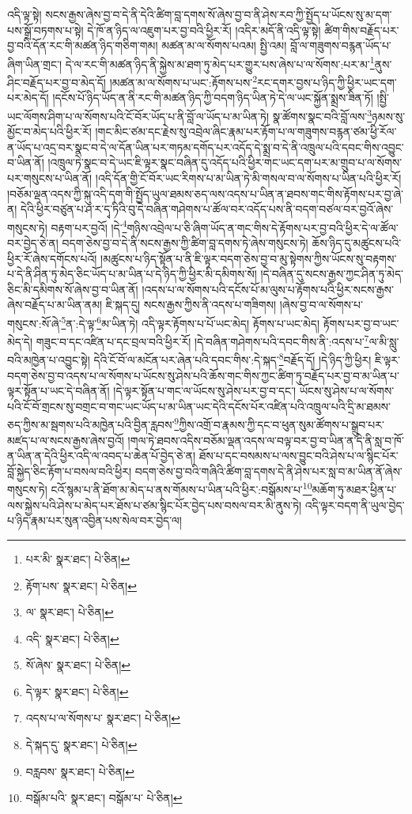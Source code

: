 འདི་ལྟ་སྟེ། སངས་རྒྱས་ཞེས་བྱ་བ་དེ་ནི་དེའི་ཚིག་བླ་དགས་སོ་ཞེས་བྱ་བ་ནི་ཤེས་རབ་ཀྱི་སྤྱོད་པ་ཡོངས་སུ་མ་དག་པས་སྒྲོ་བཏགས་པ་སྟེ། དེ་ཁོ་ན་ཉིད་ལ་འཇུག་པར་བྱ་བའི་ཕྱིར་རོ། །འདིར་མདོ་ནི་འདི་ལྟ་སྟེ། ཚིག་གིས་བརྗོད་པར་བྱ་བའི་དོན་རང་གི་མཚན་ཉིད་གཅིག་གམ། མཚན་མ་ལ་སོགས་པའམ། སྤྱི་འམ། བློ་ལ་གཟུགས་བརྙན་ཡོད་པ་ཞིག་ཡིན་གྲང་། དེ་ལ་རང་གི་མཚན་ཉིད་ནི་སྐྱེས་མ་ཐག་ཏུ་མེད་པར་གྱུར་པས་ཞེས་པ་ལ་སོགས་:པར་མ་\footnote{པར་མི་  སྣར་ཐང་།  པེ་ཅིན། }ནུས་ཤིང་བརྗོད་པར་བྱ་བ་མེད་དོ། །མཚན་མ་ལ་སོགས་པ་ཡང་:རྟོགས་པས་\footnote{རྟོག་པས་  སྣར་ཐང་།  པེ་ཅིན། }རང་དགར་བྱས་པ་ཉིད་ཀྱི་ཕྱིར་ཡང་དག་པར་མེད་དོ། །དངོས་པོ་ཉིད་ཡོད་ན་ནི་རང་གི་མཚན་ཉིད་ཀྱི་བདག་ཉིད་ཡིན་ཏེ་དེ་ལ་ཡང་སྐྱོན་སྨྲས་ཟིན་ཏོ། །སྤྱི་ཡང་ལོགས་ཤིག་པ་ལ་སོགས་པའི་ངོ་བོར་ཡོད་པ་ནི་བློ་ལ་ཡོད་པ་མ་ཡིན་ཏེ། སྣ་ཚོགས་སྣང་བའི་བློ་ལས་\footnote{ལ་  སྣར་ཐང་།  པེ་ཅིན། }ཉམས་སུ་མྱོང་བ་མེད་པའི་ཕྱིར་རོ། །གང་མིང་ཙམ་དང་རྗེས་སུ་འབྲེལ་ཞིང་རྣམ་པར་རྟོག་པ་ལ་གཟུགས་བརྙན་ཙམ་ཕྱི་རོལ་ན་ཡོད་པ་འདྲ་བར་སྣང་བ་དེ་ལ་དོན་ཡིན་པར་གཏམ་དགོད་པར་འདོད་དེ་སྨྲ་བ་དེ་ནི་འཁྲུལ་པའི་དབང་གིས་འབྱུང་བ་ཡིན་ནོ། །འཁྲུལ་ཏེ་སྣང་བ་དེ་ཡང་ཇི་ལྟར་སྣང་བཞིན་དུ་འདོད་པའི་ཕྱིར་གང་ཡང་དག་པར་མ་གྲུབ་པ་ལ་སོགས་པར་གསུངས་པ་ཡིན་ནོ། །འདི་དོན་གྱི་ངོ་བོར་ཡང་རིགས་པ་མ་ཡིན་ཏེ་མི་གསལ་བ་ལ་སོགས་པ་ཡིན་པའི་ཕྱིར་རོ། །བཅོམ་ལྡན་འདས་ཀྱི་སྐུ་འདི་དག་གི་སྤྱོད་ཡུལ་ཐམས་ཅད་ལས་འདས་པ་ཡིན་ན་ཐབས་གང་གིས་རྟོགས་པར་བྱ་ཞེ་ན། དེའི་ཕྱིར་བཙུན་པ་ཤ་ར་དྭ་ཏིའི་བུ་དེ་བཞིན་གཤེགས་པ་ཚོལ་བར་འདོད་པས་ནི་བདག་བཙལ་བར་བྱའོ་ཞེས་གསུངས་ཏེ། བརྟག་པར་བྱའོ། །དེ་\footnote{འདི་  སྣར་ཐང་།  པེ་ཅིན། }གཉིས་འབྲེལ་པ་ཅི་ཞིག་ཡོད་ན་གང་གིས་དེ་རྟོགས་པར་བྱ་བའི་ཕྱིར་དེ་ལ་ཚོལ་བར་བྱེད་ཅེ་ན། བདག་ཅེས་བྱ་བ་དེ་ནི་སངས་རྒྱས་ཀྱི་ཚིག་བླ་དགས་ཏེ་ཞེས་གསུངས་ཏེ། ཆོས་ཉིད་དུ་མཚུངས་པའི་ཕྱིར་རོ་ཞེས་དགོངས་པའོ། །མཚུངས་པ་ཉིད་སྟོན་པ་ནི་ཇི་ལྟར་བདག་ཅེས་བྱ་བ་མུ་སྟེགས་ཀྱིས་ཡོངས་སུ་བརྟགས་པ་དེ་ནི་ཤིན་ཏུ་མེད་ཅིང་ཡོད་པ་མ་ཡིན་པ་དེ་ཉིད་ཀྱི་ཕྱིར་མི་དམིགས་སོ། །དེ་བཞིན་དུ་སངས་རྒྱས་ཀྱང་ཤིན་ཏུ་མེད་ཅིང་མི་དམིགས་སོ་ཞེས་བྱ་བ་ཡིན་ནོ། །འདས་པ་ལ་སོགས་པའི་དངོས་པོ་མ་ལུས་པ་རྟོགས་པའི་ཕྱིར་སངས་རྒྱས་ཞེས་བརྗོད་པ་མ་ཡིན་ནམ། ཇི་སྐད་དུ། སངས་རྒྱས་ཀྱིས་ནི་འདས་པ་གཟིགས། །ཞེས་བྱ་བ་ལ་སོགས་པ་གསུངས་:སོ་ཞེ་\footnote{སོ་ཞེས་  སྣར་ཐང་།  པེ་ཅིན། }ན་:དེ་ལྟ་\footnote{དེ་ལྟར་  སྣར་ཐང་།  པེ་ཅིན། }མ་ཡིན་ཏེ། འདི་ལྟར་རྟོགས་པ་པོ་ཡང་མེད། རྟོགས་པ་ཡང་མེད། རྟོགས་པར་བྱ་བ་ཡང་མེད་དེ། གཟུང་བ་དང་འཛིན་པ་དང་བྲལ་བའི་ཕྱིར་རོ། །དེ་བཞིན་གཤེགས་པའི་དབང་གིས་ནི་:འདས་པ་\footnote{འདས་པ་ལ་སོགས་པ་  སྣར་ཐང་།  པེ་ཅིན། }ལ་མི་སླུ་བའི་མཁྱེན་པ་འབྱུང་སྟེ། དེའི་ངོ་བོ་ལ་མངོན་པར་ཞེན་པའི་དབང་གིས་:དེ་སྐད་\footnote{དེ་སྐད་དུ་  སྣར་ཐང་།  པེ་ཅིན། }བརྗོད་དོ། །དེ་ཉིད་ཀྱི་ཕྱིར། ཇི་ལྟར་བདག་ཅེས་བྱ་བ་འདས་པ་ལ་སོགས་པ་ཡོངས་སུ་ཤེས་པའི་ཆོས་གང་གིས་ཀྱང་ཚིག་ཏུ་བརྗོད་པར་བྱ་བ་མ་ཡིན་པ་ལྟར་སྟོན་པ་ཡང་དེ་བཞིན་ནོ། །དེ་ལྟར་སྟོན་པ་གང་ལ་ཡོངས་སུ་ཤེས་པར་བྱ་བ་དང་། ཡོངས་སུ་ཤེས་པ་ལ་སོགས་པའི་ངོ་བོ་གྲངས་སུ་བགྲང་བ་གང་ཡང་ཡོད་པ་མ་ཡིན་ཡང་དེའི་དངོས་པོར་འཛིན་པའི་འཁྲུལ་པའི་དྲི་མ་ཐམས་ཅད་ཀྱིས་མ་སྦགས་པའི་མཁྱེན་པའི་བྱིན་རླབས་\footnote{བརླབས་  སྣར་ཐང་།  པེ་ཅིན། }ཀྱིས་འགྲོ་བ་རྣམས་ཀྱི་དང་བ་ཕུན་སུམ་ཚོགས་པ་སྒྲུབ་པར་མཛད་པ་ལ་སངས་རྒྱས་ཞེས་བྱའོ། །གལ་ཏེ་ཐབས་འདིས་བཅོམ་ལྡན་འདས་ལ་བལྟ་བར་བྱ་བ་ཡིན་ན་དེ་ནི་སླ་བ་ཁོ་ན་ཡིན་ན་དེའི་ཕྱིར་འདི་ལ་འབད་པ་ཆེན་པོ་བྱེད་ཅེ་ན། ཐོས་པ་དང་བསམས་པ་ལས་བྱུང་བའི་ཤེས་པ་ལ་སྙིང་པོར་བློ་སྐྱེད་ཅིང་རྟོག་པ་བསལ་བའི་ཕྱིར། བདག་ཅེས་བྱ་བའི་གཞིའི་ཚིག་བླ་དགས་དེ་ནི་ཤེས་པར་སླ་བ་མ་ཡིན་ནོ་ཞེས་གསུངས་ཏེ། ངའོ་སྙམ་པ་ནི་ཐོག་མ་མེད་པ་ནས་གོམས་པ་ཡིན་པའི་ཕྱིར་:བསྒོམས་པ་\footnote{བསྒོམ་པའི་  སྣར་ཐང་། བསྒོམ་པ་  པེ་ཅིན། }མཆོག་ཏུ་མཐར་ཕྱིན་པ་ལས་སྐྱེས་པའི་ཤེས་པ་མེད་པར་ཐོས་པ་ཙམ་སྙིང་པོར་བྱེད་པས་བསལ་བར་མི་ནུས་ཏེ། འདི་ལྟར་བདག་ནི་ཡུལ་བྱེད་པ་ཉིད་རྣམ་པར་སུན་འབྱིན་པས་སེལ་བར་བྱེད་ལ། 